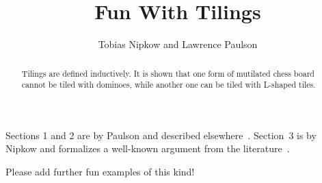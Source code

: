\documentclass[11pt,a4paper]{article}
\begin{document}
\title{Fun With Tilings}
\author{Tobias Nipkow and Lawrence Paulson}
\maketitle

\begin{abstract}
Tilings are defined inductively. It is shown that one form of mutilated
chess board cannot be tiled with dominoes, while another one can be tiled
with L-shaped tiles.
\end{abstract}


Sections 1 and 2 are by Paulson and described elsewhere~\cite{Paulson}.
Section~3 is by Nipkow and formalizes a well-known argument from the
literature~\cite{Velleman}.

Please add further fun examples of this kind!





\end{document}
